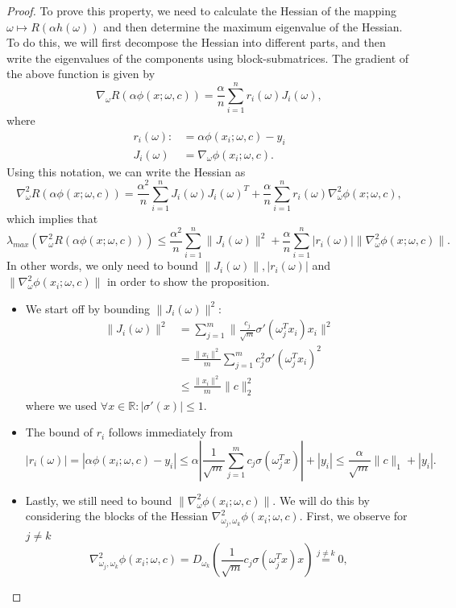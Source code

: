 \documentclass[10pt]{article} %
\newcommand{\bR}{\mathbb{R}}
\begin{document}
\begin{proof}
    To prove this property, we need to calculate the Hessian of the mapping $\omega \mapsto R(\alpha h(\omega))$ and then determine the maximum eigenvalue of the Hessian. To do this, we will first decompose the Hessian into different parts, and then write the eigenvalues of the components using block-submatrices. 
    The gradient of the above function is given by
    $$\nabla_\omega R(\alpha \phi(x;\omega,c))=\frac{\alpha}{n}\sum_{i=1}^nr_i(\omega)J_i(\omega),$$
    where 
    \begin{align*}
        r_i(\omega):&=\alpha \phi(x_i;\omega,c)-y_i\\
        J_i(\omega)&=\nabla_\omega \phi(x_i;\omega,c).
    \end{align*}
    Using this notation, we can write the Hessian as 
    $$\nabla^2_\omega R(\alpha \phi(x;\omega,c))=\frac{\alpha^2}{n}\sum_{i=1}^nJ_i(\omega)J_i(\omega)^T+\frac{\alpha}{n}\sum_{i=1}^nr_i(\omega)\nabla^2_\omega\phi(x;\omega,c),$$
    which implies that 
    $$\lambda_{max}\left(\nabla^2_\omega R(\alpha \phi(x;\omega,c))\right)\leq\frac{\alpha^2}{n}\sum_{i=1}^n\|J_i(\omega)\|^2+\frac{\alpha}{n}\sum_{i=1}^n|r_i(\omega)|\|\nabla^2_\omega\phi(x;\omega,c)\|.$$
    In other words, we only need to bound $\|J_i(\omega)\|,|r_i(\omega)|$ and $\|\nabla^2_\omega \phi(x_i;\omega,c)\|$ in order to show the proposition. 
    \begin{itemize}
        \item We start off by bounding $\|J_i(\omega)\|^2$:
        \begin{align*}
            \|J_i(\omega)\|^2&= \sum_{j=1}^m\|\frac{c_j}{\sqrt{m}}\sigma'(\omega_j^T x_i)x_i\|^2\\
            &=\frac{\|x_i\|^2}{m}\sum_{j=1}^mc_j^2\sigma'(\omega_j^Tx_i)^2\\
            &\leq \frac{\|x_i\|^2}{m}\|c\|_2^2
        \end{align*}
        where we used $\forall x\in \bR:|\sigma'(x)|\leq 1$.
        \item The bound of $r_i$ follows immediately from  $$|r_i(\omega)|=|\alpha\phi(x_i;\omega,c)-y_i|\leq \alpha|\frac{1}{\sqrt{m}}\sum_{j=1}^m c_j\sigma(\omega_j^Tx)|+|y_i|\leq \frac{\alpha}{\sqrt{m}}\|c\|_1+|y_i|.$$
        \item Lastly, we still need to bound $\|\nabla^2_\omega \phi(x_i;\omega,c)\|$. We will do this by considering the blocks of the Hessian $\nabla^2_{\omega_j,\omega_k}\phi(x_i;\omega,c)$. First, we observe for $j\neq k$ 
        $$\nabla^2_{\omega_j,\omega_k}\phi(x_i;\omega,c)=D_{\omega_k}\left(\frac{1}{\sqrt{m}}c_j\sigma(\omega_j^Tx)x\right)\overset{j\neq k}{=}0,$$

\end{itemize}
\end{proof}
\end{document}
